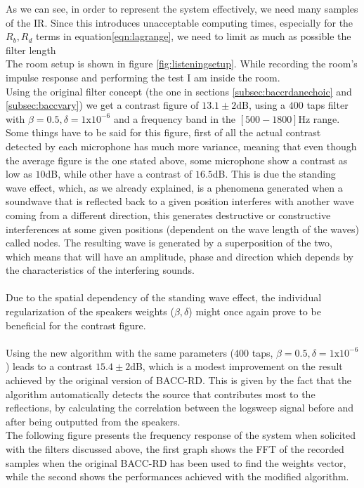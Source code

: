 As we can see, in order to represent the system effectively, we need many samples of the IR. Since this introduces unacceptable computing times, especially for the $R_b, R_d$ terms in equation\ref{eqn:lagrange}, we need to limit as much as possible the filter length
\\
The room setup is shown in figure \ref{fig:listeningsetup}. While recording the room's impulse response and performing the test I am inside the room.
\\
Using the original filter concept (the one in sections \ref{subsec:baccrdanechoic} and \ref{subsec:baccvary}) we get a contrast figure of $13.1\pm2$dB, using a $400$ taps filter with $\beta = 0.5, \delta = 1\text{x}10^{-6}$ and a frequency band in the $[500-1800]$Hz range.
Some things have to be said for this figure, first of all the actual contrast detected by each microphone has much more variance, meaning that even though the average figure is the one stated above, some microphone show a contrast as low as $10$dB, while other have a contrast of $16.5$dB. This is due the standing wave effect, which, as we already explained, is a phenomena generated when a soundwave that is reflected back to a given position interferes with another wave coming from a different direction, this generates destructive or constructive interferences at some given positions (dependent on the wave length of the waves) called nodes. The resulting wave is generated by a superposition of the two, which means that will have an amplitude, phase and direction which depends by the characteristics of the interfering sounds.
\\
\\
Due to the spatial dependency of the standing wave effect, the individual regularization of the speakers weights ($\beta, \delta$) might once again prove to be beneficial for the contrast figure.
\\
\\
Using the new algorithm with the same parameters ($400$ taps, $\beta = 0.5, \delta = 1\text{x}10^{-6}$) leads to a contrast $15.4\pm2$dB, which is a modest improvement on the result achieved by the original version of BACC-RD. This is given by the fact that the algorithm automatically detects the source that contributes most to the reflections, by calculating the correlation between the logsweep signal before and after being outputted from the speakers.
\\
The following figure presents the frequency response of the system when solicited with the filters discussed above, the first graph shows the FFT of the recorded samples when the original BACC-RD has been used to find the weights vector, while the second shows the performances achieved with the modified algorithm.

